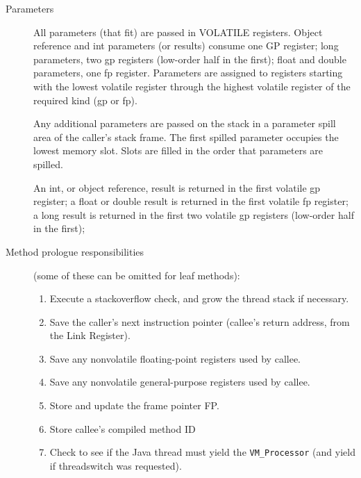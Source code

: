 \begin{description}
\item[Parameters]

    All parameters (that fit) are passed in VOLATILE registers.  Object
    reference and int parameters (or results) consume one GP register; long
    parameters, two gp registers (low-order half in the first);  float and
    double parameters, one fp register.  Parameters are 
    assigned to registers
    starting with the lowest volatile register through the highest volatile
    register of the required kind (gp or fp).

    Any additional parameters are passed on the stack in a parameter spill
    area of the caller's stack frame.  The first spilled parameter occupies
    the lowest memory slot.  Slots are filled in the order that parameters
    are spilled.

    An int, or object reference, result is returned in the first volatile
    gp register; a float or double result is returned in the first volatile
    fp register; a long result is returned in the first two volatile gp
    registers (low-order half in the first);

\item[Method prologue responsibilities] (some of these can be omitted for leaf
  methods):

\begin{enumerate}
\item Execute a stackoverflow check, and grow the thread stack if necessary.

\item Save the caller's next instruction pointer (callee's return address,
       from the Link Register).

\item Save any nonvolatile floating-point registers used by callee.

\item Save any nonvolatile general-purpose registers used by callee.

\item Store and update the frame pointer FP.\@

\item Store callee's compiled method ID 

\item Check to see if the Java\TMweb{} thread must yield the {\tt VM\_Processor}
(and yield if threadswitch was requested). 
\end{enumerate}


\end{description}
